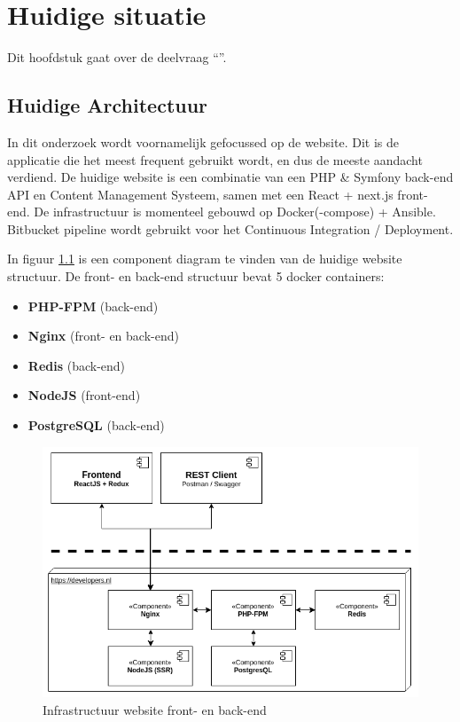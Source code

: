 \chapter{Huidige situatie}

\label{Chapter4}

Dit hoofdstuk gaat over de deelvraag \enquote{\deelhuidig}.

\section{Huidige Architectuur}
In dit onderzoek wordt voornamelijk gefocussed op de website. Dit is de applicatie die het meest frequent gebruikt wordt, en dus de meeste aandacht verdiend. De huidige website is een combinatie van een PHP \& Symfony back-end API en Content Management Systeem, samen met een React + next.js front- end. De infrastructuur is momenteel gebouwd op Docker(-compose) + Ansible. Bitbucket pipeline wordt gebruikt voor het Continuous Integration / Deployment. 

In figuur \ref{fig:infra} is een component diagram te vinden van de huidige website structuur. De front- en back-end structuur bevat 5 docker containers:
\begin{itemize}
	\item \textbf{PHP-FPM} (back-end)
	\item \textbf{Nginx} (front- en back-end)
	\item \textbf{Redis} (back-end)
	\item \textbf{NodeJS} (front-end)
	\item \textbf{PostgreSQL} (back-end)
\end{itemize}

\begin{figure}
	\centering
	\includegraphics[width=13cm]{Figures/Infrastructure}
	\decoRule
	\caption[Infrastructuur]{Infrastructuur website front- en back-end \parencite{Documentation}}
	\label{fig:infra}
\end{figure}


